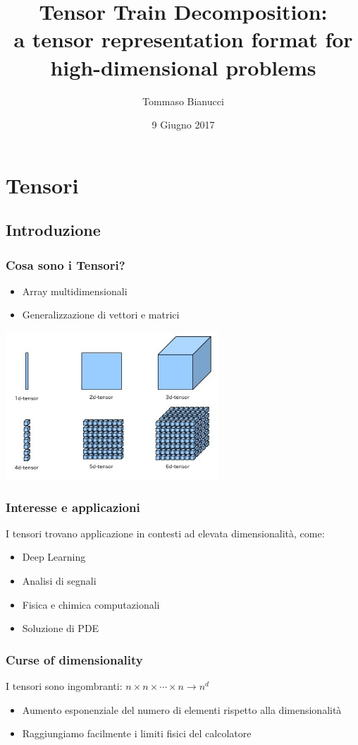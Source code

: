 \documentclass[compress]{beamer}
\title[]{Tensor Train Decomposition:\\ a tensor representation format for high-dimensional problems}
\author{Tommaso Bianucci}
\date{9 Giugno 2017}
\institute{Università di Pisa}
\theoremstyle{definition}
\theoremstyle{plain}
\begin{document}
\begin{frame}
\maketitle
\end{frame}

\section{Tensori}
\subsection{Introduzione}
\begin{frame}
\frametitle{Cosa sono i Tensori?}
\begin{itemize}
\item Array multidimensionali
\item Generalizzazione di vettori e matrici
\end{itemize}
\vspace{1mm}
\begin{center}
	\includegraphics[width=0.6\textwidth]{Img/tensors.jpg}
\end{center}
\end{frame}

\begin{frame}
\frametitle{Interesse e applicazioni}
I tensori trovano applicazione in contesti ad elevata dimensionalità, come:
\begin{itemize}
\item Deep Learning
\item Analisi di segnali
\item Fisica e chimica computazionali
\item Soluzione di PDE
\end{itemize}
\end{frame}

\begin{frame}
\frametitle{Curse of dimensionality}
I tensori sono ingombranti: \alert{$n \times n \times \cdots \times n \rightarrow n^d$}
\begin{itemize}
\item Aumento esponenziale del numero di elementi rispetto alla dimensionalità
\item Raggiungiamo facilmente i limiti fisici del calcolatore
\end{itemize}

\end{frame}	
\end{document}

